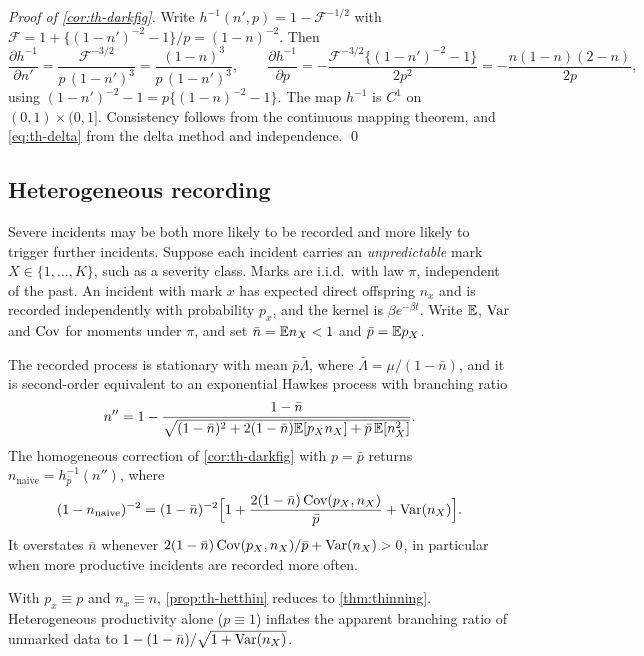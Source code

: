 \emph{Proof of \cref{cor:th-darkfig}.} Write $h^{-1}(n',p)=1-\mathcal F^{-1/2}$ with
$\mathcal F=1+\{(1-n')^{-2}-1\}/p=(1-n)^{-2}$. Then
\[
\frac{\partial h^{-1}}{\partial n'}=\frac{\mathcal F^{-3/2}}{p\,(1-n')^3}=\frac{(1-n)^3}{p\,(1-n')^3},
\qquad
\frac{\partial h^{-1}}{\partial p}=-\frac{\mathcal F^{-3/2}\{(1-n')^{-2}-1\}}{2p^2}
=-\frac{n(1-n)(2-n)}{2p},
\]
using $(1-n')^{-2}-1=p\{(1-n)^{-2}-1\}$. The map $h^{-1}$ is $C^1$ on
$(0,1)\times(0,1]$. Consistency follows from the continuous mapping theorem, and
\eqref{eq:th-delta} from the delta method and independence. \qed

\subsection{Heterogeneous recording}\label{app:th-hetthin}

Severe incidents may be both more likely to be
recorded and more likely to trigger further incidents. Suppose each incident carries an
\emph{unpredictable} mark $X\in\{1,\dots,K\}$, such as a severity class. Marks are
i.i.d.\ with law $\pi$, independent of the past. An incident with mark $x$ has expected
direct offspring $n_x$ and is recorded independently with probability $p_x$, and the
kernel is $\beta e^{-\beta t}$. Write $\mathbb{E}$, $\operatorname{Var}$ and $\operatorname{Cov}$ for moments under $\pi$,
and set $\bar n=\mathbb{E} n_X<1$ and $\bar p=\mathbb{E} p_X$.

\begin{proposition}\label{prop:th-hetthin}
The recorded process is stationary with mean $\bar p\bar\Lambda$, where
$\bar\Lambda=\mu/(1-\bar n)$, and it is second-order equivalent to an exponential Hawkes
process with branching ratio
\[
n''=1-\frac{1-\bar n}{\sqrt{(1-\bar n)^2+2(1-\bar n)\mathbb{E}[p_Xn_X]+\bar p\,\mathbb{E}[n_X^2]}} .
\]
The homogeneous correction of \cref{cor:th-darkfig} with $p=\bar p$ returns
$n_{\mathrm{naive}}=h_{\bar p}^{-1}(n'')$, where
\[
(1-n_{\mathrm{naive}})^{-2}=(1-\bar n)^{-2}\Big[1+\frac{2(1-\bar n)\operatorname{Cov}(p_X,n_X)}{\bar p}+\operatorname{Var}(n_X)\Big].
\]
It overstates $\bar n$ whenever $2(1-\bar n)\operatorname{Cov}(p_X,n_X)/\bar p+\operatorname{Var}(n_X)>0$, in
particular when more productive incidents are recorded more often.
\end{proposition}

With $p_x\equiv p$ and $n_x\equiv n$, \cref{prop:th-hetthin} reduces to \cref{thm:thinning}.
Heterogeneous productivity alone ($p\equiv1$) inflates the apparent branching ratio of
unmarked data to $1-(1-\bar n)/\sqrt{1+\operatorname{Var}(n_X)}$.

